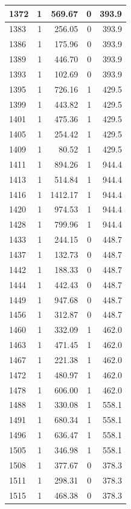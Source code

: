 \documentclass[
  12pt,
]{book}
\begin{document}
\begin{tabular}{l|r|r|r|r}
\hline
1372 & 1 & 569.67 & 0 & 393.9\\
\hline
1383 & 1 & 256.05 & 0 & 393.9\\
\hline
1386 & 1 & 175.96 & 0 & 393.9\\
\hline
1389 & 1 & 446.70 & 0 & 393.9\\
\hline
1393 & 1 & 102.69 & 0 & 393.9\\
\hline
1395 & 1 & 726.16 & 1 & 429.5\\
\hline
1399 & 1 & 443.82 & 1 & 429.5\\
\hline
1401 & 1 & 475.36 & 1 & 429.5\\
\hline
1405 & 1 & 254.42 & 1 & 429.5\\
\hline
1409 & 1 & 80.52 & 1 & 429.5\\
\hline
1411 & 1 & 894.26 & 1 & 944.4\\
\hline
1413 & 1 & 514.84 & 1 & 944.4\\
\hline
1416 & 1 & 1412.17 & 1 & 944.4\\
\hline
1420 & 1 & 974.53 & 1 & 944.4\\
\hline
1428 & 1 & 799.96 & 1 & 944.4\\
\hline
1433 & 1 & 244.15 & 0 & 448.7\\
\hline
1437 & 1 & 132.73 & 0 & 448.7\\
\hline
1442 & 1 & 188.33 & 0 & 448.7\\
\hline
1444 & 1 & 442.43 & 0 & 448.7\\
\hline
1449 & 1 & 947.68 & 0 & 448.7\\
\hline
1456 & 1 & 312.87 & 0 & 448.7\\
\hline
1460 & 1 & 332.09 & 1 & 462.0\\
\hline
1463 & 1 & 471.45 & 1 & 462.0\\
\hline
1467 & 1 & 221.38 & 1 & 462.0\\
\hline
1472 & 1 & 480.97 & 1 & 462.0\\
\hline
1478 & 1 & 606.00 & 1 & 462.0\\
\hline
1488 & 1 & 330.08 & 1 & 558.1\\
\hline
1491 & 1 & 680.34 & 1 & 558.1\\
\hline
1496 & 1 & 636.47 & 1 & 558.1\\
\hline
1505 & 1 & 346.98 & 1 & 558.1\\
\hline
1508 & 1 & 377.67 & 0 & 378.3\\
\hline
1511 & 1 & 298.31 & 0 & 378.3\\
\hline
1515 & 1 & 468.38 & 0 & 378.3\\

\end{tabular}
\end{document}
